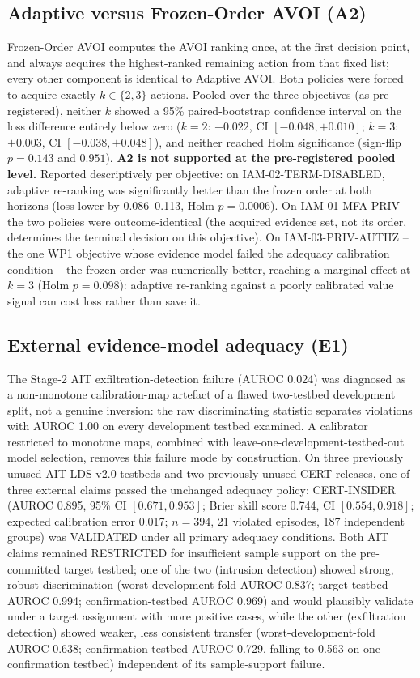 \subsection{Adaptive versus Frozen-Order AVOI (A2)}
Frozen-Order AVOI computes the AVOI ranking once, at the first decision point, and always acquires the
highest-ranked remaining action from that fixed list; every other component is identical to Adaptive AVOI. Both
policies were forced to acquire exactly $k\in\{2,3\}$ actions. Pooled over the three objectives (as pre-registered),
neither $k$ showed a 95\% paired-bootstrap confidence interval on the loss difference entirely below zero ($k=2$:
$-0.022$, CI $[-0.048,+0.010]$; $k=3$: $+0.003$, CI $[-0.038,+0.048]$), and neither reached Holm significance
(sign-flip $p=0.143$ and $0.951$). \textbf{A2 is not supported at the pre-registered pooled level.} Reported
descriptively per objective: on IAM-02-TERM-DISABLED, adaptive re-ranking was significantly better than the frozen
order at both horizons (loss lower by 0.086--0.113, Holm $p=0.0006$). On IAM-01-MFA-PRIV the two policies were
outcome-identical (the acquired evidence set, not its order, determines the terminal decision on this objective). On
IAM-03-PRIV-AUTHZ -- the one WP1 objective whose evidence model failed the adequacy calibration condition -- the
frozen order was numerically better, reaching a marginal effect at $k=3$ (Holm $p=0.098$): adaptive re-ranking against
a poorly calibrated value signal can cost loss rather than save it.

\subsection{External evidence-model adequacy (E1)}
The Stage-2 AIT exfiltration-detection failure (AUROC 0.024) was diagnosed as a non-monotone calibration-map artefact
of a flawed two-testbed development split, not a genuine inversion: the raw discriminating statistic separates
violations with AUROC 1.00 on every development testbed examined. A calibrator restricted to monotone maps, combined
with leave-one-development-testbed-out model selection, removes this failure mode by construction. On three
previously unused AIT-LDS v2.0 testbeds and two previously unused CERT releases, one of three external claims passed
the unchanged adequacy policy: CERT-INSIDER (AUROC 0.895, 95\% CI $[0.671,0.953]$; Brier skill score 0.744, CI
$[0.554,0.918]$; expected calibration error 0.017; $n=394$, 21 violated episodes, 187 independent groups) was
VALIDATED under all primary adequacy conditions. Both AIT claims remained RESTRICTED for insufficient sample support
on the pre-committed target testbed; one of the two (intrusion detection) showed strong, robust discrimination
(worst-development-fold AUROC 0.837; target-testbed AUROC 0.994; confirmation-testbed AUROC 0.969) and would plausibly
validate under a target assignment with more positive cases, while the other (exfiltration detection) showed weaker,
less consistent transfer (worst-development-fold AUROC 0.638; confirmation-testbed AUROC 0.729, falling to 0.563 on
one confirmation testbed) independent of its sample-support failure.


